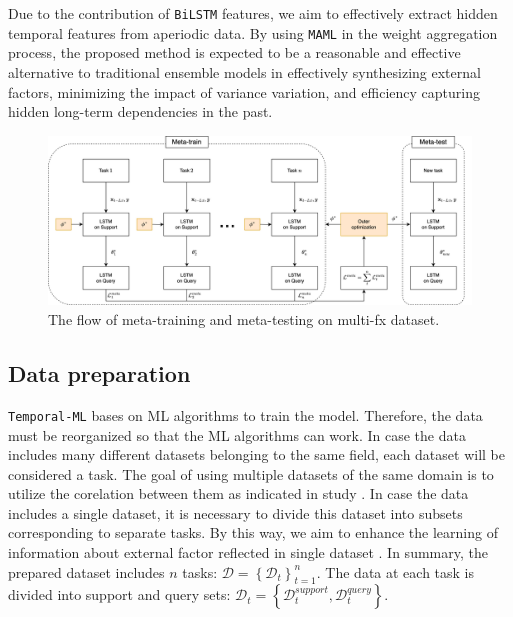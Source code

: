 \documentclass[a4paper,fleqn]{cas-sc}
\begin{document}
Due to the contribution of \verb|BiLSTM| features, we aim to effectively extract hidden temporal features from aperiodic data. By using \verb|MAML| in the weight aggregation process, the proposed method is expected to be a reasonable and effective alternative to traditional ensemble models in effectively synthesizing external factors, minimizing the impact of variance variation, and efficiency capturing hidden long-term dependencies in the past.

\begin{figure}
    \centering
    \includegraphics[width=\textwidth]{figs/meta.png}
    \caption{The flow of meta-training and meta-testing on multi-fx dataset.}
    \label{fig:flow}
\end{figure}

\subsection{Data preparation}
\label{subsec:method_data}

\verb|Temporal-ML| bases on ML algorithms to train the model. Therefore, the data must be reorganized so that the ML algorithms can work. In case the data includes many different datasets belonging to the same field, each dataset will be considered a task. The goal of using multiple datasets of the same domain is to utilize the corelation between them as indicated in study \cite{overreactioncontrarian, mech1993portfolio}. In case the data includes a single dataset, it is necessary to divide this dataset into subsets corresponding to separate tasks. By this way, we aim to enhance the learning of information about external factor reflected in single dataset \cite{fama1970efficient}. In summary, the prepared dataset includes $n$ tasks: $\mathcal{D} = \left\{ \mathcal{D}_t \right\}_{t=1}^{n}$. The data at each task is divided into support and query sets: $\mathcal{D}_t = \left\{ \mathcal{D}_t^{support}, \mathcal{D}_t^{query} \right\}$.

\vspace{1mm}
\end{document}
